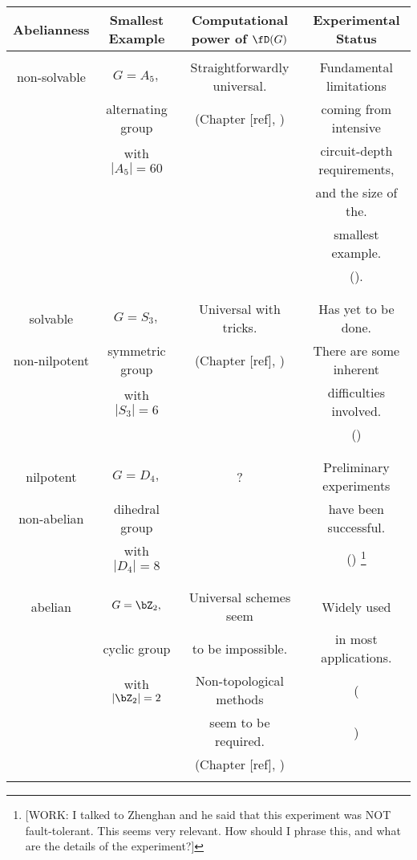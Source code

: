 \begin{center}
\begin{tabular}{|| c | c | c | c ||} 

\hline
Abelianness & Smallest Example& Computational power of $\fD(G)$& Experimental Status \\ [0.5ex] 
 \hline\hline
  &  & &\\ 
 non-solvable & $G=A_5,$ & Straightforwardly universal.& Fundamental limitations\\
  & alternating group & (Chapter [ref], \cite{mochon2003anyons})& coming from intensive\\ 
  & with $|A_5|=60$ & & circuit-depth requirements,\\ 
  &  & & and the size of the.\\ 
  &  & & smallest example.\\ 
  &  & & (\cite{bravyi2022adaptive}).\\ 
  &  & &\\ 
 \hline
  &  & &\\ 
 solvable& $G=S_3,$ & Universal with tricks. & Has yet to be done.\\
 non-nilpotent& symmetric group& (Chapter [ref], \cite{mochon2004anyon}) & There are some inherent \\ 
 & with $|S_3|=6$ & & difficulties involved.\\ 
  &  & & (\cite{tantivasadakarn2023hierarchy})\\ 
  &  & &\\ 
 \hline  &  & &\\ 
 nilpotent& $G=D_4,$ & ? & Preliminary experiments \\
 non-abelian& dihedral group & & have been successful.  \\ 
 & with $|D_4|=8$ & & (\cite{iqbal2024non}) \footnote{[WORK: I talked to Zhenghan and he said that this experiment was NOT fault-tolerant. This seems very relevant. How should I phrase this, and what are the details of the experiment?]}   \\ 
  &  & &\\ 
 \hline
  &  & &\\ 
 abelian & $G=\bZ_2,$ & Universal schemes seem& Widely used\\ 
  & cyclic group & to be impossible.& in most applications. \\ 
  &with $|\bZ_2|=2$ &  Non-topological methods& (\cite{bravyi2024high, hong2024entangling}\\ 
  &  & seem to be required.& \cite{balewski2024engineering, google2023suppressing})\\ 
  &  & (Chapter [ref], \cite{bravyi2013classification, eastin2009restrictions}) &\\ 
  &  & &\\ 
 \hline
\end{tabular}
\end{center}

